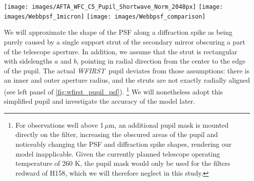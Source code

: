 \documentclass[modern, times]{aastex61}
\newcommand\wfirst{\textit{WFIRST}}
\newcommand\webbpsf{{\sc WebbPSF}}
\begin{document}
\begin{figure*}[t]
  \texttt{[image: images/AFTA\_WFC\_C5\_Pupil\_Shortwave\_Norm\_2048px]}
   \texttt{[image: images/Webbpsf\_1micron]}
   \texttt{[image: images/Webbpsf\_comparison]}
  \caption{\emph{Left:} \wfirst\ WFC Cycle 5 pupil for filters from R062 to H158. For reference, the aperture diameter is 2.37\,m. \emph{Center:} \webbpsf\ model of a monochromatic point source with $\lambda=1\,\mu$m in the center of the focal plane. Colors have logarithmic stretch. The presence of 12 diffraction spikes instead of 6 is a consequence of the non-radial alignment of the support struts. \emph{Right:} Visual comparison and horizontal profiles at peak intensity of the  \webbpsf\ model and the analytical model of a single support strut given in \autoref{eq:psf2d}. The \webbpsf\ model was internally oversampled by a factor 10, rotated, and then downsampled to the final resolution.}
\label{fig:wfirst_pupil_psf}
\end{figure*}


We will approximate the shape of the PSF along a diffraction spike as being purely caused by a single support strut of the secondary mirror obscuring a part of the telescope aperture.
In addition, we assume that the strut is rectangular with sidelengths $a$ and $b$, pointing in radial direction from the center to the edge of the pupil.
The actual \wfirst\ pupil deviates from those assumptions: there is an inner and outer aperture radius, and the struts are not exactly radially aligned (see left panel of \autoref{fig:wfirst_pupil_psf}).%
\footnote{For observations well above 1\,$\mu$m, an additional pupil mask is mounted directly on the filter, increasing the obscured areas of the pupil and noticeably changing the PSF and diffraction spike shapes, rendering our model inapplicable. Given the currently planned telescope operating temperature of 260 K, the pupil mask would only be used for the filters redward of  H158, which we will therefore neglect in this study.}
We will nonetheless adopt this simplified pupil and investigate the accuracy of the model later.
\end{document}
